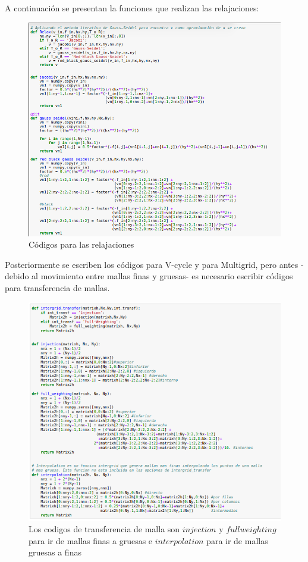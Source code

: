\documentclass[letter,10pt]{article}
\begin{document}
A continuación se presentan la funciones que realizan las relajaciones:

\begin{figure}[H]
\centering
\includegraphics[scale=0.85]{img/relajaciones}
\caption{Códigos para las relajaciones}
\label{relax}
\end{figure}

Posteriormente se escriben los códigos para V-cycle y para Multigrid, pero antes -debido al movimiento entre mallas finas y gruesas- es necesario escribir códigos para transferencia de mallas. 

\begin{figure}[H]
\centering 
\includegraphics[scale=1.1]{img/intergridcode}
\caption{Los codigos de transferencia de malla son $injection$ y $full weighting$ para ir de mallas finas a gruesas e $interpolation$ para ir de mallas gruesas a finas}
\label{intergridcode}
\end{figure}
\end{document}
